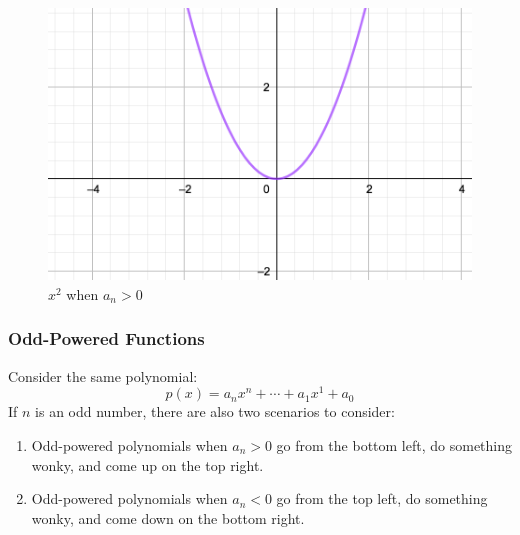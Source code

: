 \documentclass{beamer}
\begin{document}
    \begin{frame}
        \begin{example}
            \begin{figure}
                \caption{$x^2$ when $a_n > 0$} 
                \includegraphics[scale=0.3]{images/x2-gtd-0.png}
            \end{figure}
        \end{example}
    \end{frame}
    \begin{frame}
        \frametitle{Odd-Powered Functions}
        Consider the same polynomial:
        $$
            p(x) = a_{n}x^n + \cdots + a_1x^1 + a_0
        $$
        If $n$ is an odd number, there are also two scenarios to consider: 
        \begin{enumerate}
            \item Odd-powered polynomials when $a_n > 0$ go from the bottom left, do something wonky, and come up on the top right.
            \item Odd-powered polynomials when $a_n < 0$ go from the top left, do something wonky, and come down on the bottom right.
        \end{enumerate}
    \end{frame}
\end{document}
